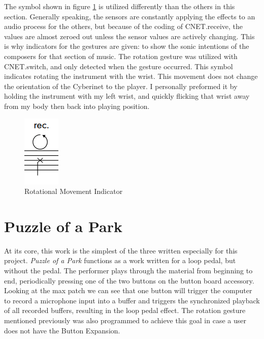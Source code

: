 The symbol shown in figure \ref{fig:rotateMovement} is utilized differently than the others in this section. Generally speaking, the sensors are constantly applying the effects to an audio process for the others, but because of the coding of CNET.receive, the values are almost zeroed out unless the sensor values are actively changing. This is why indicators for the gestures are given: to show the sonic intentions of the composers for that section of music. The rotation gesture was utilized with CNET.switch, and only detected when the gesture occurred. This symbol indicates rotating the instrument with the wrist. This movement does not change the orientation of the Cyberinet to the player. I personally preformed it by holding the instrument with my left wrist, and quickly flicking that wrist away from my body then back into playing position.

\begin{figure}
    \centering
    \includegraphics[scale=1.3]{Scores/trigger.png}
    \caption{Rotational Movement Indicator}
    \label{fig:rotateMovement}
\end{figure}




\section{Puzzle of a Park}
At its core, this work is the simplest of the three written especially for this project. \textit{Puzzle of a Park} functions as a work written for a loop pedal, but without the pedal. The performer plays through the material from beginning to end, periodically pressing one of the two buttons on the button board accessory. Looking at the max patch we can see that one button will trigger the computer to record a microphone input into a buffer and triggers the synchronized playback of all recorded buffers, resulting in the loop pedal effect. The rotation gesture mentioned previously was also programmed to achieve this goal in case a user does not have the Button Expansion.

